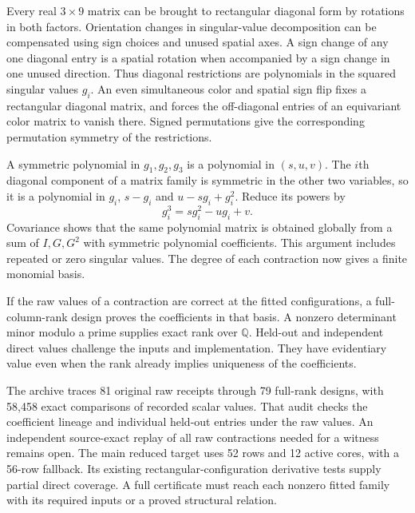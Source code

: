 Every real $3\times9$ matrix can be brought to rectangular diagonal form by rotations in both factors. Orientation changes in singular-value decomposition can be compensated using sign choices and unused spatial axes. A sign change of any one diagonal entry is a spatial rotation when accompanied by a sign change in one unused direction. Thus diagonal restrictions are polynomials in the squared singular values $g_i$. An even simultaneous color and spatial sign flip fixes a rectangular diagonal matrix, and forces the off-diagonal entries of an equivariant color matrix to vanish there. Signed permutations give the corresponding permutation symmetry of the restrictions.

A symmetric polynomial in $g_1,g_2,g_3$ is a polynomial in $(s,u,v)$. The $i$th diagonal component of a matrix family is symmetric in the other two variables, so it is a polynomial in $g_i$, $s-g_i$ and $u-sg_i+g_i^2$. Reduce its powers by
\[
 g_i^3=sg_i^2-ug_i+v .
\]
Covariance shows that the same polynomial matrix is obtained globally from a sum of $I,G,G^2$ with symmetric polynomial coefficients. This argument includes repeated or zero singular values. The degree of each contraction now gives a finite monomial basis.

If the raw values of a contraction are correct at the fitted configurations, a full-column-rank design proves the coefficients in that basis. A nonzero determinant minor modulo a prime supplies exact rank over $\mathbb Q$. Held-out and independent direct values challenge the inputs and implementation. They have evidentiary value even when the rank already implies uniqueness of the coefficients.

The archive traces 81 original raw receipts through 79 full-rank designs, with 58,458 exact comparisons of recorded scalar values. That audit checks the coefficient lineage and individual held-out entries under the raw values. An independent source-exact replay of all raw contractions needed for a witness remains open. The main reduced target uses 52 rows and 12 active cores, with a 56-row fallback. Its existing rectangular-configuration derivative tests supply partial direct coverage. A full certificate must reach each nonzero fitted family with its required inputs or a proved structural relation.

